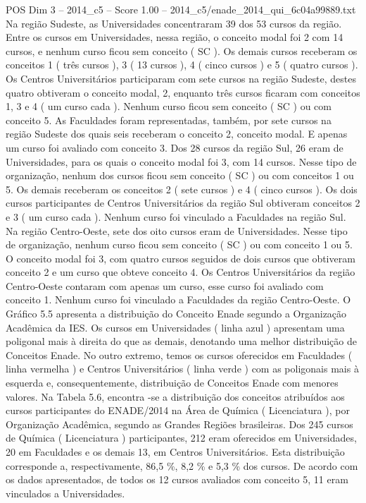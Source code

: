 \begin{textsample}{POS Dim 3 – 2014\_c5 – Score 1.00 – 2014\_c5/enade\_2014\_qui\_6c04a99889.txt}
Na região Sudeste, as Universidades concentraram 39 dos 53 cursos da região.
Entre os cursos em Universidades, nessa região, o conceito modal foi 2 com 14 cursos, e nenhum curso ficou sem conceito ( SC ).
Os demais cursos receberam os conceitos 1 ( três cursos ), 3 ( 13 cursos ), 4 ( cinco cursos ) e 5 ( quatro cursos ).
Os Centros Universitários participaram com sete cursos na região Sudeste, destes quatro obtiveram o conceito modal, 2, enquanto três cursos ficaram com conceitos 1, 3 e 4 ( um curso cada ).
Nenhum curso ficou sem conceito ( SC ) ou com conceito 5.
As Faculdades foram representadas, também, por sete cursos na região Sudeste dos quais seis receberam o conceito 2, conceito modal.
E apenas um curso foi avaliado com conceito 3.
Dos 28 cursos da região Sul, 26 eram de Universidades, para os quais o conceito modal foi 3, com 14 cursos.
Nesse tipo de organização, nenhum dos cursos ficou sem conceito ( SC ) ou com conceitos 1 ou 5.
Os demais receberam os conceitos 2 ( sete cursos ) e 4 ( cinco cursos ).
Os dois cursos participantes de Centros Universitários da região Sul obtiveram conceitos 2 e 3 ( um curso cada ).
Nenhum curso foi vinculado a Faculdades na região Sul.
Na região Centro-Oeste, sete dos oito cursos eram de Universidades.
Nesse tipo de organização, nenhum curso ficou sem conceito ( SC ) ou com conceito 1 ou 5.
O conceito modal foi 3, com quatro cursos seguidos de dois cursos que obtiveram conceito 2 e um curso que obteve conceito 4.
Os Centros Universitários da região Centro-Oeste contaram com apenas um curso, esse curso foi avaliado com conceito 1.
Nenhum curso foi vinculado a Faculdades da região Centro-Oeste.
O Gráfico 5.5 apresenta a distribuição do Conceito Enade segundo a Organização Acadêmica da IES.
Os cursos em Universidades ( linha azul ) apresentam uma poligonal mais à direita do que as demais, denotando uma melhor distribuição de Conceitos Enade.
No outro extremo, temos os cursos oferecidos em Faculdades ( linha vermelha ) e Centros Universitários ( linha verde ) com as poligonais mais à esquerda e, consequentemente, distribuição de Conceitos Enade com menores valores.
Na Tabela 5.6, encontra -se a distribuição dos conceitos atribuídos aos cursos participantes do ENADE/2014 na Área de Química ( Licenciatura ), por Organização Acadêmica, segundo as Grandes Regiões brasileiras.
Dos 245 cursos de Química ( Licenciatura ) participantes, 212 eram oferecidos em Universidades, 20 em Faculdades e os demais 13, em Centros Universitários.
Esta distribuição corresponde a, respectivamente, 86,5 \%, 8,2 \% e 5,3 \% dos cursos.
De acordo com os dados apresentados, de todos os 12 cursos avaliados com conceito 5, 11 eram vinculados a Universidades.

\end{textsample}
